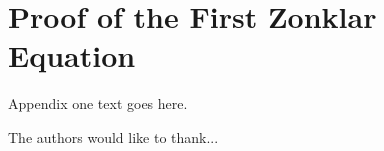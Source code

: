 \documentclass[journal,comsoc]{IEEEtran}
\begin{document}
%


\appendices
\section{Proof of the First Zonklar Equation}
Appendix one text goes here.


The authors would like to thank...


\ifCLASSOPTIONcaptionsoff
  \newpage
\fi





%
%
%


 

\end{document}

